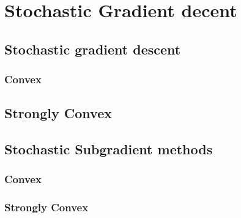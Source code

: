 




\section{Stochastic Gradient decent}



\subsection{Stochastic gradient descent}
\subsubsection{Convex}
\label{sec:convexsmoothsgd}

% 



\subsection{Strongly Convex}


\subsection{Stochastic Subgradient methods}
\subsubsection{Convex}
\label{sec:sgdcvxnonsmth}


\subsubsection{Strongly Convex}
\label{sec:sgdscvxnonsmth}





